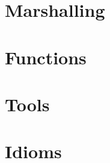 \documentclass{beamer}
\begin{document}
\section{Marshalling}

\section{Functions}

\section{Tools}

\section{Idioms}

\begin{frame}
\end{frame}
\end{document}
